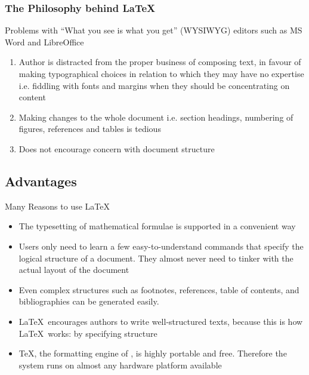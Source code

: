 \documentclass[10pt]{beamer}
\begin{document}
\begin{frame}\frametitle{The Philosophy behind \LaTeX}

\begin{block}{Problems with ``What you see is what you get'' (WYSIWYG) editors such as MS Word and LibreOffice}
\begin{enumerate}
\item Author is distracted from the proper business of composing text, in favour of making typographical choices in relation to which they may have no expertise i.e. fiddling with fonts and margins when they should be concentrating on content
\item Making changes to the whole document i.e. section headings, numbering of figures, references and tables is tedious
\item Does not encourage concern with document structure
\end{enumerate}
\end{block}


\end{frame}




\subsection{Advantages}
\begin{frame}{Many Reasons to use \LaTeX}
\begin{itemize}
\item The typesetting of mathematical formulae is supported in a convenient way
\item  Users only need to learn a few easy-to-understand commands that specify the logical structure of a document. They almost never need to
tinker with the actual layout of the document
\item Even complex structures such as footnotes, references, table of contents, and bibliographies can be generated easily.
\item \LaTeX \, encourages authors to write well-structured texts, because this is how \LaTeX \, works: by specifying structure
\item \TeX, the formatting engine of \LaTeXe, is highly portable and free. Therefore the system runs on almost any hardware platform available
\end{itemize}
\end{frame}
\end{document}
